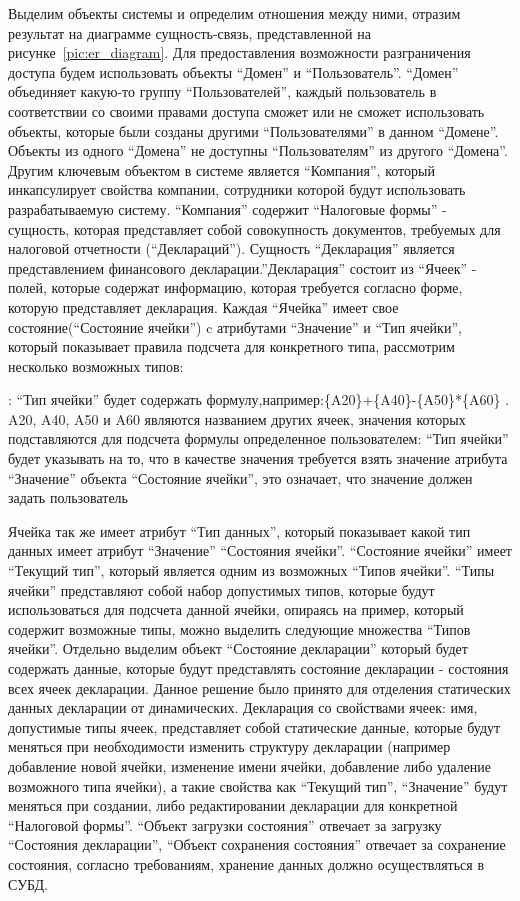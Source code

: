 \documentclass[14pt,a4paper]{reportmod}
\begin{document}
Выделим объекты системы и определим отношения между ними, отразим результат на диаграмме сущность-связь, представленной на рисунке~\ref{pic:er_diagram}. Для предоставления возможности разграничения доступа будем использовать объекты ``Домен'' и ``Пользователь''. ``Домен'' объединяет какую-то группу ``Пользователей'', каждый пользователь в соответствии со своими правами доступа сможет или не сможет использовать объекты, которые были созданы другими ``Пользователями'' в данном ``Домене''. Объекты из одного ``Домена'' не доступны ``Пользователям'' из другого ``Домена''. Другим ключевым объектом в системе является ``Компания'', который инкапсулирует свойства компании, сотрудники которой будут использовать разрабатываемую систему. ``Компания'' содержит ``Налоговые формы'' - сущность, которая представляет собой совокупность документов, требуемых для налоговой отчетности (``Деклараций''). Сущность ``Декларация'' является представлением финансового декларации.''Декларация'' состоит из ``Ячеек'' - полей, которые содержат информацию, которая требуется согласно форме, которую представляет декларация. Каждая ``Ячейка'' имеет свое состояние(``Состояние ячейки'') c атрибутами ``Значение'' и ``Тип ячейки'', который показывает правила подсчета для конкретного типа, рассмотрим несколько возможных типов:
\begin{itemize}
  : ``Тип ячейки'' будет содержать формулу,например:\{A20\}+\{A40\}-\{A50\}*\{A60\} . A20, A40, A50 и A60 являются названием других ячеек, значения которых подставляются для подсчета формулы
   определенное пользователем: ``Тип ячейки'' будет указывать на то, что в качестве значения требуется взять значение атрибута ``Значение'' объекта ``Состояние ячейки'', это означает, что значение должен задать пользователь
\end{itemize}
Ячейка так же имеет атрибут ``Тип данных'', который показывает какой тип данных имеет атрибут ``Значение'' ``Состояния ячейки''. ``Состояние ячейки'' имеет ``Текущий тип'', который является одним из возможных ``Типов ячейки''. ``Типы ячейки'' представляют собой набор допустимых типов, которые будут использоваться для подсчета данной ячейки, опираясь на пример, который содержит возможные типы, можно выделить следующие множества ``Типов ячейки''.
Отдельно выделим объект ``Состояние декларации'' который будет содержать данные, которые будут представлять состояние декларации - состояния всех ячеек декларации. Данное решение было принято для отделения статических данных декларации от динамических. Декларация со свойствами ячеек: имя, допустимые типы ячеек, представляет собой статические данные, которые будут меняться при необходимости изменить структуру декларации (например добавление новой ячейки, изменение имени ячейки, добавление либо удаление возможного типа ячейки), а такие свойства как ``Текущий тип'', ``Значение'' будут меняться при создании, либо редактировании декларации для конкретной ``Налоговой формы''. ``Объект загрузки состояния'' отвечает за загрузку ``Состояния декларации'', ``Объект сохранения состояния'' отвечает за сохранение состояния, согласно требованиям, хранение данных должно осуществляться в СУБД.
\end{document}
